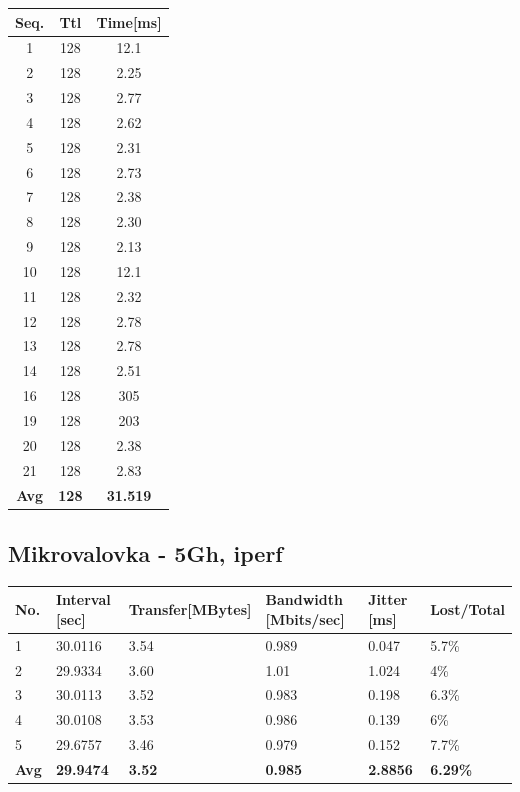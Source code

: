 \documentclass[11pt,a4paper,slovene]{article}
\begin{document}
 
\begin{table}[H]
	\begin{adjustwidth}{-3cm}{-3cm}
	\centering
		\begin{tabular}{c|c|c}
		\hline
		\textbf{Seq.} & \textbf{Ttl} & \textbf{Time[ms]}\\
     	\hline
     	1 & 128 & 12.1\\
  		2 & 128 & 2.25\\
  		3 & 128 & 2.77\\
  		4 & 128 & 2.62\\
  		5 & 128 & 2.31\\
  		6 & 128 & 2.73\\
  		7 & 128 & 2.38\\
  		8 & 128 & 2.30\\
  		9 & 128 & 2.13\\
  		10 & 128 & 12.1\\
  		11 & 128 & 2.32\\
  		12 & 128 & 2.78\\
  		13 & 128 & 2.78\\
  		14 & 128 & 2.51\\
  		16 & 128 & 305\\
  		19 & 128 & 203\\
  		20 & 128 & 2.38\\
  		21 & 128 & 2.83\\
  		\hline
  		\textbf{Avg} & \textbf{128} & \textbf{31.519}\\
  		\hline
  		\end{tabular}
    	\end{adjustwidth}
\end{table}



\subsection{Mikrovalovka - 5Gh, iperf}

\begin{table}[H]
	\begin{adjustwidth}{-3cm}{-3cm}
	\centering
		\begin{tabular}{l|l|l|l|l|l}
		\hline
		\textbf{No.} & \textbf{Interval [sec]} & \textbf{Transfer[MBytes]} & \textbf{Bandwidth [Mbits/sec]} & \textbf{Jitter [ms]} & \textbf{Lost/Total} \\
     	\hline
     	1 & 30.0116 & 3.54 & 0.989 & 0.047 & 5.7\% \\
  		2 & 29.9334 & 3.60 & 1.01 & 1.024 & 4\% \\
  		3 & 30.0113 & 3.52 & 0.983 & 0.198 & 6.3\% \\
  		4 & 30.0108 & 3.53 & 0.986 & 0.139 & 6\% \\
  		5 & 29.6757 & 3.46 & 0.979 & 0.152 & 7.7\% \\
  		\hline
  		\textbf{Avg} & \textbf{29.9474} & \textbf{3.52} & \textbf{0.985} & \textbf{2.8856} & \textbf{6.29\%} \\
  		\hline
    		\end{tabular}
    	\end{adjustwidth}
\end{table}
\end{document}
